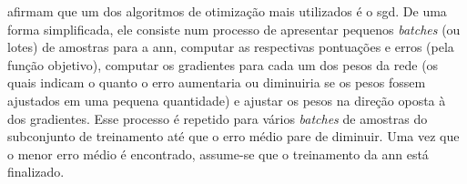 

 afirmam que um dos algoritmos de otimização mais utilizados é o \acrfull{sgd}.
De uma forma simplificada, ele consiste num processo de apresentar pequenos \textit{batches} (ou lotes) de amostras para a \acrshort{ann}, computar as respectivas pontuações e erros (pela função objetivo), computar os gradientes para cada um dos pesos da rede (os quais indicam o quanto o erro aumentaria ou diminuiria se os pesos fossem ajustados em uma pequena quantidade) e ajustar os pesos na direção oposta à dos gradientes.
Esse processo é repetido para vários \textit{batches} de amostras do subconjunto de treinamento até que o erro médio pare de diminuir.
Uma vez que o menor erro médio é encontrado, assume-se que o treinamento da \acrshort{ann} está finalizado.


